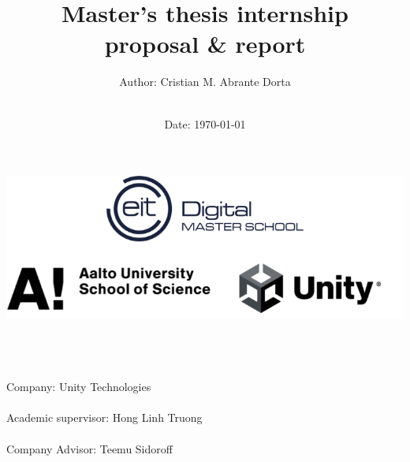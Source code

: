 

\makeatletter
    \begin{titlepage}
        \begin{center}
	   { \includegraphics[width=16cm]
	   {src/internship-report/proposal-logo.png}}
	   {\ \\ \ \\}
	   
        \vbox{}\vspace{5cm}
            \title{
            \bf\Huge Master's thesis internship \\ proposal \& report}
            \author{\large Author: Cristian M. Abrante Dorta\\ \ \\}
            
            \date{\large Date: \today}
            
            {\@title }\\[3cm] 
            {\@author}
            {\large Company:  Unity Technologies\\ \ \\} 
            {\large Academic supervisor: Hong Linh Truong\\ \ \\}
            {\large Company Advisor: Teemu Sidoroff\\ \ \\} 
            {\@date\\}

        \end{center}
    \end{titlepage}
\makeatother